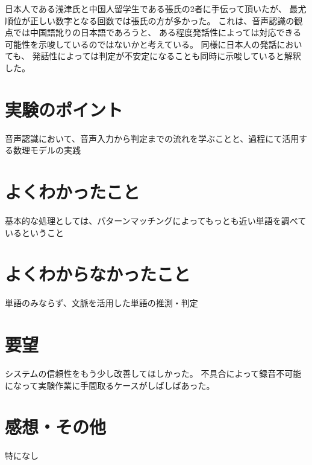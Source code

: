 \documentclass[11pt,a4paper, uplatex]{jsarticle}
\begin{document}
日本人である浅津氏と中国人留学生である張氏の2者に手伝って頂いたが、
最尤順位が正しい数字となる回数では張氏の方が多かった。
これは、音声認識の観点では中国語訛りの日本語であろうと、
ある程度発話性によっては対応できる可能性を示唆しているのではないかと考えている。
同様に日本人の発話においても、
発話性によっては判定が不安定になることも同時に示唆していると解釈した。

\section{実験のポイント}
音声認識において、音声入力から判定までの流れを学ぶことと、過程にて活用する数理モデルの実践

\section{よくわかったこと}
基本的な処理としては、パターンマッチングによってもっとも近い単語を調べているということ

\section{よくわからなかったこと}
単語のみならず、文脈を活用した単語の推測・判定

\section{要望}
システムの信頼性をもう少し改善してほしかった。
不具合によって録音不可能になって実験作業に手間取るケースがしばしばあった。

\section{感想・その他}
特になし
\end{document}
